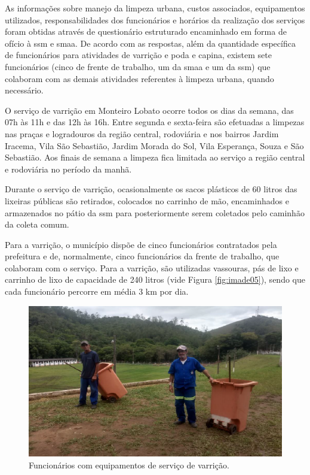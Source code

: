 As informações sobre manejo da limpeza urbana, custos associados, equipamentos utilizados, responsabilidades dos funcionários e horários da realização dos serviços foram obtidas através de questionário estruturado encaminhado em forma de ofício à \gls{ssm} e \gls{smaa}. De acordo com as respostas, além da quantidade específica de funcionários para atividades de varrição e poda e capina, existem sete funcionários (cinco de frente de trabalho, um da \gls{smaa} e um da \gls{ssm}) que colaboram com as demais atividades referentes à limpeza urbana, quando necessário.

O serviço de varrição em Monteiro Lobato ocorre todos os dias da semana, das 07h às 11h e das 12h às 16h. Entre segunda e sexta-feira são efetuadas a limpezas nas praças e logradouros da região central, rodoviária e nos bairros Jardim Iracema, Vila São Sebastião, Jardim Morada do Sol, Vila Esperança, Souza e São Sebastião. Aos finais de semana a limpeza fica limitada ao serviço a região central e rodoviária no período da manhã.

Durante o serviço de varrição, ocasionalmente os sacos plásticos de 60 litros das lixeiras públicas são retirados, colocados no carrinho de mão, encaminhados e armazenados no pátio da \gls{ssm} para posteriormente serem coletados pelo caminhão da coleta comum.


Para a varrição, o município dispõe de cinco funcionários contratados pela prefeitura e de, normalmente, cinco funcionários da frente de trabalho, que colaboram com o serviço. Para a varrição, são utilizadas vassouras, pás de lixo e carrinho de lixo de capacidade de 240 litros (vide Figura \ref{fig:imade05}), sendo que cada funcionário percorre em média 3 km por dia.

\begin{figure}
	\centering
	\includegraphics[width=0.7\linewidth]{produtos/prodtres/image051}
	\caption{Funcionários com equipamentos de serviço de varrição.}
	\label{fig:image051}
\end{figure}

